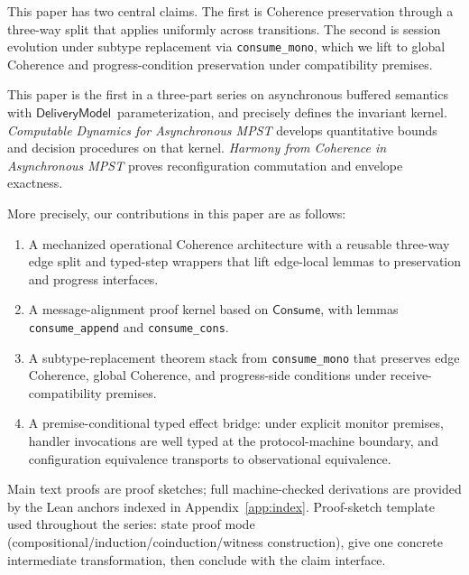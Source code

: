 \documentclass[a4paper,10pt,twocolumn,english]{article}
\numberwithin{equation}{section}
\theoremstyle{paperdef}
\theoremstyle{paperplain}
\theoremstyle{paperdef}
\theoremstyle{paperremark}
\newcommand{\Consume}{\ensuremath{\mathsf{Consume}}}
\newcommand{\DeliveryModel}{\ensuremath{\mathsf{DeliveryModel}}}
\begin{document}
This paper has two central claims. The first is Coherence preservation through a three-way split that
applies uniformly across transitions. The second is session evolution under subtype replacement via
\nolinkurl{consume_mono}, which we lift to global Coherence and progress-condition preservation under
compatibility premises.

This paper is the first in a three-part series on asynchronous buffered semantics with \DeliveryModel\ parameterization, and precisely defines the invariant kernel.
\emph{Computable Dynamics for Asynchronous MPST} develops quantitative bounds and decision procedures on that kernel.
\emph{Harmony from Coherence in Asynchronous MPST} proves reconfiguration commutation and envelope exactness.

More precisely, our contributions in this paper are as follows:
\begin{enumerate}
	\item A mechanized operational Coherence architecture with a reusable three-way edge split and typed-step wrappers that lift edge-local lemmas to preservation and progress interfaces.
	\item A message-alignment proof kernel based on \Consume, with lemmas \nolinkurl{consume_append} and \nolinkurl{consume_cons}.
	\item A subtype-replacement theorem stack from \nolinkurl{consume_mono} that preserves edge Coherence, global Coherence, and progress-side conditions under receive-compatibility premises.
	\item A premise-conditional typed effect bridge: under explicit monitor premises, handler invocations are well typed at the protocol-machine boundary, and configuration equivalence transports to observational equivalence.
\end{enumerate}

Main text proofs are proof sketches; full machine-checked derivations are provided by the Lean anchors indexed in Appendix~\ref{app:index}.
Proof-sketch template used throughout the series: state proof mode
(compositional/induction/coinduction/witness construction), give one concrete
intermediate transformation, then conclude with the claim interface.
\end{document}
